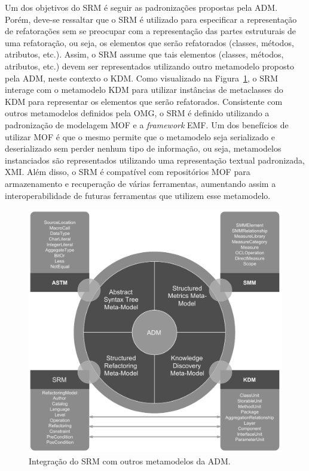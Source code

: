 Um dos objetivos do SRM é seguir as padronizações propostas pela ADM. Porém, deve-se ressaltar que o SRM é utilizado para especificar a representação de refatorações sem se preocupar com a representação das partes estruturais de uma refatoração, ou seja, os elementos que serão refatorados (classes, métodos, atributos, etc.). Assim, o SRM assume que tais elementos (classes, métodos, atributos, etc.) devem ser representados utilizando outro metamodelo proposto pela ADM, neste contexto o KDM. Como visualizado na Figura~\ref{fig:refactoring_metamodel}, o SRM interage com o metamodelo KDM para utilizar instâncias de metaclasses do KDM para representar os elementos que serão refatorados. Consistente com outros metamodelos definidos pela OMG, o SRM é definido utilizando a padronização de modelagem MOF e a \textit{framework} EMF. Um dos benefícios de utilizar MOF é que o mesmo permite que o metamodelo seja serializado e deserializado sem perder nenhum tipo de informação, ou seja, metamodelos instanciados são representados utilizando uma representação textual padronizada, XMI. Além disso, o SRM é compatível com repositórios MOF para armazenamento e recuperação de várias ferramentas, aumentando assim a interoperabilidade de futuras ferramentas que utilizem esse metamodelo.

\begin{figure}[h]
	\centering
	\caption{Integração do SRM com outros metamodelos da ADM.}
	\label{fig:refactoring_metamodel}
	\includegraphics[scale=0.6]{images/SRM2Formatted}
	\fautor
\end{figure}


